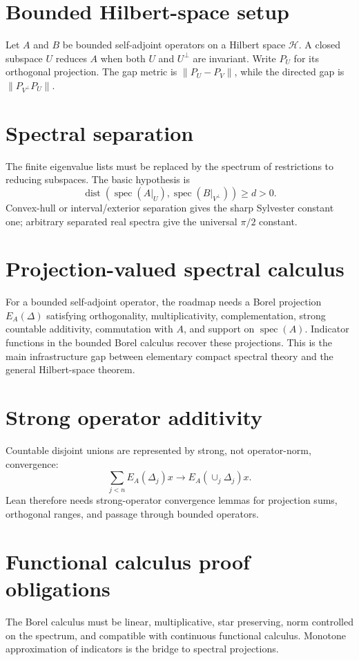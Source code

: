 \documentclass{article}
\newcommand{\Hh}{\mathcal H}
\newcommand{\spec}{\operatorname{spec}}
\newcommand{\dist}{\operatorname{dist}}
\begin{document}
\section{Bounded Hilbert-space setup}
Let $A$ and $B$ be bounded self-adjoint operators on a Hilbert space $\Hh$.
A closed subspace $U$ reduces $A$ when both $U$ and $U^\perp$ are invariant.
Write $P_U$ for its orthogonal projection.  The gap metric is
$\|P_U-P_V\|$, while the directed gap is $\|P_{V^\perp}P_U\|$.

\section{Spectral separation}
The finite eigenvalue lists must be replaced by the spectrum of restrictions
to reducing subspaces.  The basic hypothesis is
\[
  \dist(\spec(A|_U),\spec(B|_{V^\perp}))\ge d>0.
\]
Convex-hull or interval/exterior separation gives the sharp Sylvester constant
one; arbitrary separated real spectra give the universal $\pi/2$ constant.

\section{Projection-valued spectral calculus}
For a bounded self-adjoint operator, the roadmap needs a Borel projection
$E_A(\Delta)$ satisfying orthogonality, multiplicativity, complementation,
strong countable additivity, commutation with $A$, and support on
$\spec(A)$.  Indicator functions in the bounded Borel calculus recover these
projections.  This is the main infrastructure gap between elementary compact
spectral theory and the general Hilbert-space theorem.

\section{Strong operator additivity}
Countable disjoint unions are represented by strong, not operator-norm,
convergence:
\[
  \sum_{j<n}E_A(\Delta_j)x\longrightarrow E_A(\cup_j\Delta_j)x.
\]
Lean therefore needs strong-operator convergence lemmas for projection sums,
orthogonal ranges, and passage through bounded operators.

\section{Functional calculus proof obligations}
The Borel calculus must be linear, multiplicative, star preserving, norm
controlled on the spectrum, and compatible with continuous functional
calculus.  Monotone approximation of indicators is the bridge to spectral
projections.
\end{document}
